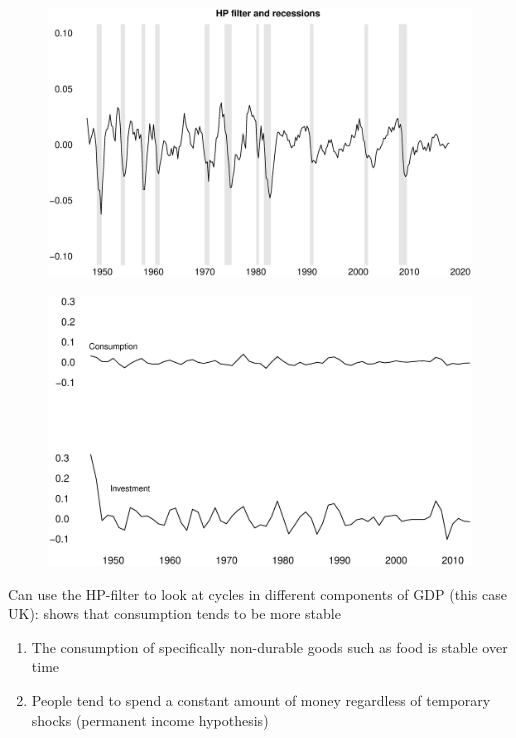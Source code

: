 \documentclass{beamer}
\begin{document}
\begin{frame}
  \begin{figure}
    \includegraphics[scale=.25]{hp_filter2.eps}
  \end{figure}
\end{frame}

\begin{frame}
  \begin{figure}
    \includegraphics[scale=.3]{uk_ci.eps}
  \end{figure}
\end{frame}

\begin{frame}
  Can use the HP-filter to look at cycles in different components of GDP (this case UK): shows that consumption tends to be more stable
  \begin{enumerate}
    \item The consumption of specifically non-durable goods such as food is stable over time
    \item People tend to spend a constant amount of money regardless of temporary shocks (permanent income hypothesis)
  \end{enumerate}
\end{frame}
\end{document}
